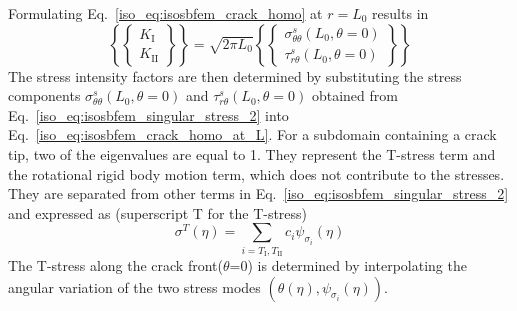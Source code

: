 Formulating Eq.~\ref{iso_eq:isosbfem_crack_homo} at $r=L_0$ results in
\begin{equation}
    \left\{
        \begin{Bmatrix}
            K_{\mathrm{I}}\\
            K_{\mathrm{II}}
        \end{Bmatrix}
    \right\}=\sqrt{2\pi L_0}\left\{
        \begin{Bmatrix}
            \sigma_{\theta\theta}^s(L_0,\theta=0) \\
            \tau_{r\theta}^s(L_0,\theta=0)
        \end{Bmatrix}
    \right\}
\label{iso_eq:isosbfem_crack_homo_at_L}
\end{equation}
The stress intensity factors are then determined by substituting the stress components $\sigma_{\theta\theta}^s(L_0,\theta=0)$ and $\tau_{r\theta}^s(L_0,\theta=0)$ obtained from Eq.~\ref{iso_eq:isosbfem_singular_stress_2} into Eq.~\ref{iso_eq:isosbfem_crack_homo_at_L}.
For a subdomain containing a crack tip, two of the eigenvalues are equal to 1.
They represent the T-stress term and the rotational rigid body motion term, which does not contribute to the stresses.
They are separated from other terms in Eq.~\ref{iso_eq:isosbfem_singular_stress_2} and expressed as (superscript T for the T-stress)
\begin{equation}
    \sigma^T(\eta) = 
    \sum_{ i=T_{ \mathrm{I} }, T_{ \mathrm{II} } }
    c_i \psi_{\sigma_i} (\eta)
\end{equation}
The T-stress along the crack front($\theta$=0) is determined by interpolating the angular variation of the two stress modes $(\theta(\eta), \psi_{\sigma_i} (\eta))$.